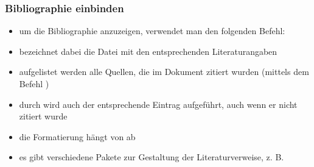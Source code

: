 \begin{frame}[fragile]
	\frametitle{Bibliographie einbinden}
	\begin{itemize}
		\item um die Bibliographie anzuzeigen, verwendet man den folgenden Befehl:\\
		\item {} bezeichnet dabei die Datei mit den entsprechenden Literaturangaben
		\item aufgelistet werden alle Quellen, die im Dokument zitiert wurden (mittels dem Befehl )
		\item durch  wird auch der  entsprechende Eintrag aufgeführt, auch wenn er nicht zitiert wurde
		\item die Formatierung hängt von  ab
		\item es gibt verschiedene Pakete zur Gestaltung der Literaturverweise, z. B. 
	\end{itemize}
\end{frame}

